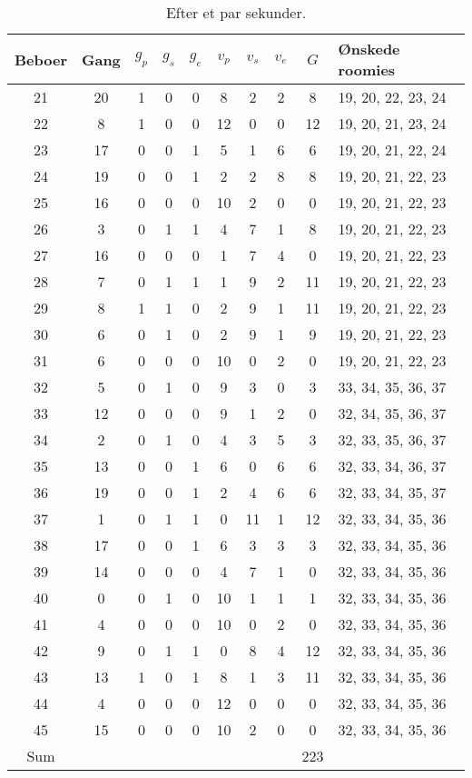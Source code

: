 \documentclass[article,oneside,11pt,a4paper]{memoir}
\newenvironment{assignment}[1]{
\begin{table}[h]
\caption{#1}
\footnotesize
\begin{center}
\begin{tabular}{cccccccccl}
\toprule
Beboer & Gang & $g_p$ & $g_s$ & $g_e$ & $v_p$ & $v_s$ & $v_e$ & $G$ & Ønskede roomies \\ \midrule
}{
\bottomrule
\end{tabular}
\end{center}
\end{table}

}
\begin{document}
\begin{assignment}{Efter et par sekunder.}
    21 &   20 &   1 &   0 &   0 &   8 &   2 &   2 &  8 & 19, 20, 22, 23, 24 \\
    22 &    8 &   1 &   0 &   0 &  12 &   0 &   0 & 12 & 19, 20, 21, 23, 24 \\
    23 &   17 &   0 &   0 &   1 &   5 &   1 &   6 &  6 & 19, 20, 21, 22, 24 \\
    24 &   19 &   0 &   0 &   1 &   2 &   2 &   8 &  8 & 19, 20, 21, 22, 23 \\
    25 &   16 &   0 &   0 &   0 &  10 &   2 &   0 &  0 & 19, 20, 21, 22, 23 \\
    26 &    3 &   0 &   1 &   1 &   4 &   7 &   1 &  8 & 19, 20, 21, 22, 23 \\
    27 &   16 &   0 &   0 &   0 &   1 &   7 &   4 &  0 & 19, 20, 21, 22, 23 \\
    28 &    7 &   0 &   1 &   1 &   1 &   9 &   2 & 11 & 19, 20, 21, 22, 23 \\
    29 &    8 &   1 &   1 &   0 &   2 &   9 &   1 & 11 & 19, 20, 21, 22, 23 \\
    30 &    6 &   0 &   1 &   0 &   2 &   9 &   1 &  9 & 19, 20, 21, 22, 23 \\
    31 &    6 &   0 &   0 &   0 &  10 &   0 &   2 &  0 & 19, 20, 21, 22, 23 \\ \midrule
    32 &    5 &   0 &   1 &   0 &   9 &   3 &   0 &  3 & 33, 34, 35, 36, 37 \\
    33 &   12 &   0 &   0 &   0 &   9 &   1 &   2 &  0 & 32, 34, 35, 36, 37 \\
    34 &    2 &   0 &   1 &   0 &   4 &   3 &   5 &  3 & 32, 33, 35, 36, 37 \\
    35 &   13 &   0 &   0 &   1 &   6 &   0 &   6 &  6 & 32, 33, 34, 36, 37 \\
    36 &   19 &   0 &   0 &   1 &   2 &   4 &   6 &  6 & 32, 33, 34, 35, 37 \\
    37 &    1 &   0 &   1 &   1 &   0 &  11 &   1 & 12 & 32, 33, 34, 35, 36 \\
    38 &   17 &   0 &   0 &   1 &   6 &   3 &   3 &  3 & 32, 33, 34, 35, 36 \\
    39 &   14 &   0 &   0 &   0 &   4 &   7 &   1 &  0 & 32, 33, 34, 35, 36 \\
    40 &    0 &   0 &   1 &   0 &  10 &   1 &   1 &  1 & 32, 33, 34, 35, 36 \\
    41 &    4 &   0 &   0 &   0 &  10 &   0 &   2 &  0 & 32, 33, 34, 35, 36 \\
    42 &    9 &   0 &   1 &   1 &   0 &   8 &   4 & 12 & 32, 33, 34, 35, 36 \\
    43 &   13 &   1 &   0 &   1 &   8 &   1 &   3 & 11 & 32, 33, 34, 35, 36 \\
    44 &    4 &   0 &   0 &   0 &  12 &   0 &   0 &  0 & 32, 33, 34, 35, 36 \\
    45 &   15 &   0 &   0 &   0 &  10 &   2 &   0 &  0 & 32, 33, 34, 35, 36 \\ \midrule
Sum &&&&&&&& 223 & \\
\end{assignment}
\end{document}

